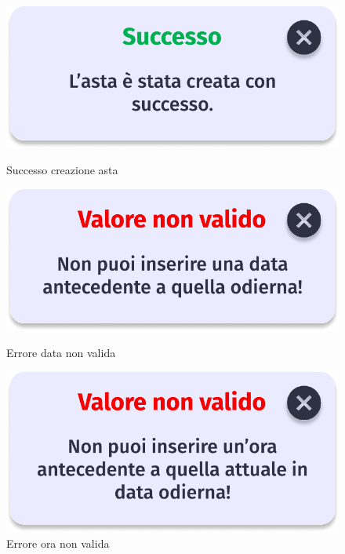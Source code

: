         \begin{figure}[!htb]
            \begin{minipage}{0.32\textwidth}
                \centering
                \includegraphics[width=.7\linewidth]{Immagini/Frames/Popup/P20.pdf}
                \caption{Successo creazione asta}
            \end{minipage}\hfill
            \begin{minipage}{0.32\textwidth}
                \centering
                \includegraphics[width=.7\linewidth]{Immagini/Frames/Popup/P19.pdf}
                \caption{Errore data non valida}
            \end{minipage}\hfill
            \begin{minipage}{0.32\textwidth}
                \centering
                \includegraphics[width=.7\linewidth]{Immagini/Frames/Popup/P14.pdf}
                \caption{Errore ora non valida}
            \end{minipage}\hfill
        \end{figure}
    

